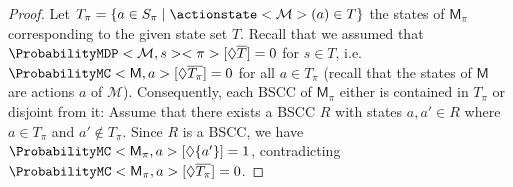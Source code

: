 \documentclass{article}
\newcommand{\MC}{\mathsf{M}}
\newcommand{\MDP}{\mathcal{M}}
\newcommand{\States}{S}
\newcommand{\strategy}{\pi}
\newcommand{\reach}{\Diamond}
\newcommand{\targetset}{T}
\begin{document}
\begin{proof}
	Let $\targetset_\strategy = \{a \in \States_\strategy \mid \actionstate<\MDP>(a) \in \targetset \}$ the states of $\MC_\strategy$ corresponding to the given state set $\targetset$.
	Recall that we assumed that $\ProbabilityMDP<\MDP, s><\strategy>[\reach \overline{\targetset}] = 0$ for $s \in \targetset$, i.e.\ $\ProbabilityMC<\MC, a>[\reach \overline{\targetset_\strategy}] = 0$ for all $a \in \targetset_\strategy$ (recall that the states of $\MC$ are actions $a$ of $\MDP$).
	Consequently, each BSCC of $\MC_\strategy$ either is contained in $\targetset_\strategy$ or disjoint from it:
	Assume that there exists a BSCC $R$ with states $a, a' \in R$ where $a \in \targetset_\strategy$ and $a' \notin \targetset_\strategy$.
	Since $R$ is a BSCC, we have $\ProbabilityMC<\MC_\strategy, a>[\reach \{a'\}] = 1$, contradicting $\ProbabilityMC<\MC_\strategy, a>[\reach \overline{\targetset_\strategy}] = 0$.


\end{proof}
\end{document}
